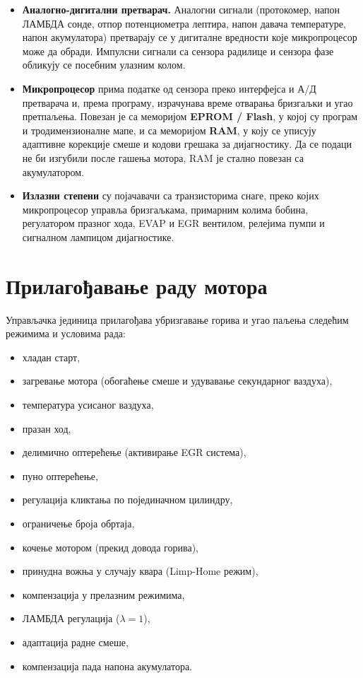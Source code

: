 \documentclass[12pt]{article}
\begin{document}
\begin{kljucno}
\begin{itemize}
    \item \textbf{Аналогно-дигитални претварач.} Аналогни сигнали (протокомер,
          напон ЛАМБДА сонде, отпор потенциометра лептира, напон давача
          температуре, напон акумулатора) претварају се у дигиталне вредности
          које микропроцесор може да обради. Импулсни сигнали са сензора
          радилице и сензора фазе обликују се посебним улазним колом.
    \item \textbf{Микропроцесор} прима податке од сензора преко интерфејса и
          А/Д претварача и, према програму, израчунава време отварања
          бризгаљки и угао претпаљења. Повезан је са меморијом
          \textbf{EPROM / Flash}, у којој су програм и тродимензионалне мапе,
          и са меморијом \textbf{RAM}, у коју се уписују адаптивне корекције
          смеше и кодови грешака за дијагностику. Да се подаци не би изгубили
          после гашења мотора, RAM је стално повезан са акумулатором.
    \item \textbf{Излазни степени} су појачавачи са транзисторима снаге, преко
          којих микропроцесор управља бризгаљкама, примарним колима бобина,
          регулатором празног хода, EVAP и EGR вентилом, релејима пумпи и
          сигналном лампицом дијагностике.
\end{itemize}
\end{kljucno}

\section{Прилагођавање раду мотора}

Управљачка јединица прилагођава убризгавање горива и угао паљења следећим
режимима и условима рада:
\begin{itemize}[noitemsep]
    \item хладан старт,
    \item загревање мотора (обогаћење смеше и удувавање секундарног ваздуха),
    \item температура усисаног ваздуха,
    \item празан ход,
    \item делимично оптерећење (активирање EGR система),
    \item пуно оптерећење,
    \item регулација кликтања по појединачном цилиндру,
    \item ограничење броја обртаја,
    \item кочење мотором (прекид довода горива),
    \item принудна вожња у случају квара (Limp-Home режим),
    \item компензација у прелазним режимима,
    \item ЛАМБДА регулација ($\lambda = 1$),
    \item адаптација радне смеше,
    \item компензација пада напона акумулатора.
\end{itemize}
\end{document}
